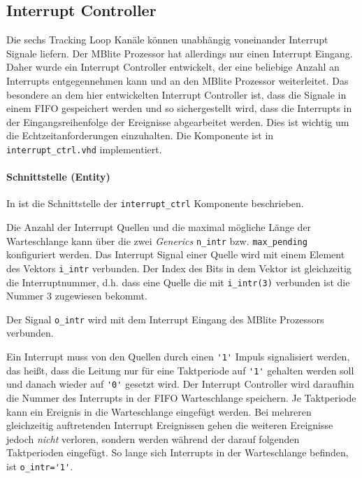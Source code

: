 \subsection{Interrupt Controller}
\label{InterruptController}
Die sechs Tracking Loop Kanäle können unabhängig voneinander Interrupt Signale liefern. Der MBlite Prozessor hat allerdings nur einen Interrupt Eingang. Daher wurde ein Interrupt Controller entwickelt, der eine beliebige Anzahl an Interrupts entgegennehmen kann und an den MBlite Prozessor weiterleitet. Das besondere an dem hier entwickelten Interrupt Controller ist, dass die Signale in einem FIFO gespeichert werden und so sichergestellt wird, dass die Interrupts in der Eingangsreihenfolge der Ereignisse abgearbeitet werden. Dies ist wichtig um die Echtzeitanforderungen einzuhalten. Die Komponente ist in \lstinline$interrupt_ctrl.vhd$ implementiert. 


\paragraph{Schnittstelle (Entity)}
In  ist die Schnittstelle der \lstinline$interrupt_ctrl$ Komponente beschrieben.

Die Anzahl der Interrupt Quellen und die maximal mögliche Länge der Warteschlange kann über die zwei \emph{Generics} \lstinline$n_intr$ bzw. \lstinline$max_pending$ konfiguriert werden. Das Interrupt Signal einer Quelle wird mit einem Element des Vektors \lstinline$i_intr$ verbunden. Der Index des Bits in dem Vektor ist gleichzeitig die Interruptnummer, d.h. dass eine Quelle die mit \lstinline$i_intr(3)$ verbunden ist die Nummer 3 zugewiesen bekommt.

Der Signal \lstinline$o_intr$ wird mit dem Interrupt Eingang des MBlite Prozessors verbunden. 

Ein Interrupt muss von den Quellen durch einen  \lstinline$'1'$ Impuls signalisiert werden, das heißt, dass die Leitung nur für eine Taktperiode auf  \lstinline$'1'$ gehalten werden soll und danach wieder auf  \lstinline$'0'$ gesetzt wird. Der Interrupt Controller wird daraufhin die Nummer des Interrupts in der FIFO Warteschlange speichern. Je Taktperiode kann ein Ereignis in die Warteschlange eingefügt werden. Bei mehreren gleichzeitig auftretenden Interrupt Ereignissen gehen die weiteren Ereignisse jedoch \emph{nicht} verloren, sondern werden während der darauf folgenden Taktperioden eingefügt. So lange sich Interrupts in der Warteschlange befinden, ist \lstinline$o_intr='1'$. 

